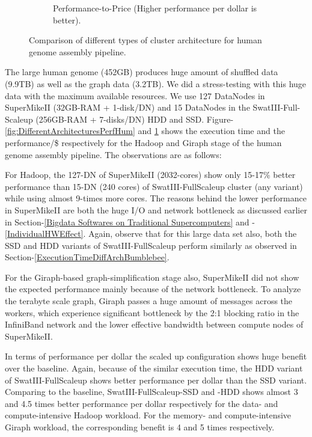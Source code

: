 \documentclass[conference]{IEEEtran}
\begin{document}
\begin{figure}[htb]
\begin{subfigure}[b]{0.23\textwidth}
                \caption{Performance-to-Price (Higher performance per dollar is better).}
                \label{fig:DifferentArchitecturesPerfPerDollarHum}
        \end{subfigure}
        \caption{Comparison of different types of cluster architecture for human genome assembly pipeline.}
  \label{fig:DifferentArchitecturesHum}
  \vspace{-1.9em}
\end{figure}
The large human genome (452GB)  produces huge amount of shuffled data (9.9TB) as well as the graph data (3.2TB). We did a stress-testing with this huge data with the maximum available resources. We use 127 DataNodes in SuperMikeII (32GB-RAM + 1-disk/DN) and 15 DataNodes in the SwatIII-Full-Scaleup (256GB-RAM + 7-disks/DN) HDD and SSD. Figure-\ref{fig:DifferentArchitecturesPerfHum} and \ref{fig:DifferentArchitecturesPerfPerDollarHum} shows the execution time and the performance/\$ respectively for the Hadoop and Giraph stage of the human genome assembly pipeline. The observations are as follows:
\begin{inparaenum}[\itshape 1\upshape)]
\item For Hadoop, the 127-DN of SuperMikeII (2032-cores) show only 15-17\% better performance than 15-DN (240 cores) of SwatIII-FullScaleup cluster (any variant) while using almost 9-times more cores. The reasons behind the lower performance in SuperMikeII are both the huge I/O and network bottleneck as discussed earlier in Section-\ref{Bigdata Softwares on Traditional Supercomputers} and -\ref{IndividualHWEffect}. Again, observe that for this large data set also, both the SSD and HDD variants of SwatIII-FullScaleup perform similarly as observed in Section-\ref{ExecutionTimeDiffArchBumblebee}.
\item For the Giraph-based graph-simplification stage also, SuperMikeII did not show the expected performance mainly because of the network bottleneck. To analyze the terabyte scale graph, Giraph passes a huge amount of messages across the workers, which experience significant bottleneck by the 2:1 blocking ratio in the InfiniBand network and the lower effective bandwidth between compute nodes of SuperMikeII.  
\item In terms of performance per dollar the scaled up configuration shows huge benefit over the baseline. Again, because of the similar execution time, the HDD variant of SwatIII-FullScaleup shows better performance per dollar than the SSD variant. Comparing to the baseline, SwatIII-FullScaleup-SSD and -HDD shows almost 3 and 4.5 times better performance per dollar respectively for the data- and compute-intensive Hadoop workload. For the memory- and compute-intensive Giraph workload, the corresponding benefit is 4 and 5 times respectively.

\end{inparaenum}
\end{document}
